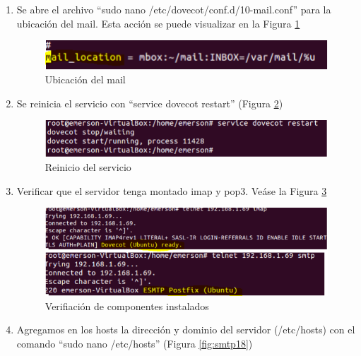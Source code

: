 \begin{enumerate}
    \item Se abre el archivo ``sudo nano /etc/dovecot/conf.d/10-mail.conf'' para la ubicación del mail. Esta acción se puede visualizar en la Figura \ref{fig:smtp15}
    
    \begin{figure}[H]
        \centering
        \includegraphics[scale=1]{imagenes/primero/paso15_smtp.PNG}
        \caption{Ubicación del mail}
        \label{fig:smtp15}
    \end{figure}
    
    \item Se reinicia el servicio con ``service dovecot restart'' (Figura \ref{fig:smtp16})
    
    \begin{figure}[H]
        \centering
        \includegraphics[scale=.96]{imagenes/primero/paso16_smtp.PNG}
        \caption{Reinicio del servicio}
        \label{fig:smtp16}
    \end{figure}
    
    \item Verificar que el servidor tenga montado imap y pop3. Veáse la Figura \ref{fig:smtp17}
    
    \begin{figure}[H]
        \centering
        \includegraphics[scale=.96]{imagenes/primero/paso17_smtp.PNG}
        \caption{Verifiación de componentes instalados}
        \label{fig:smtp17}
    \end{figure}
    
    \item Agregamos en los hosts la dirección y dominio del servidor (/etc/hosts) con el comando ``sudo nano /etc/hosts'' (Figura \ref{fig:smtp18})
    

\end{enumerate}
